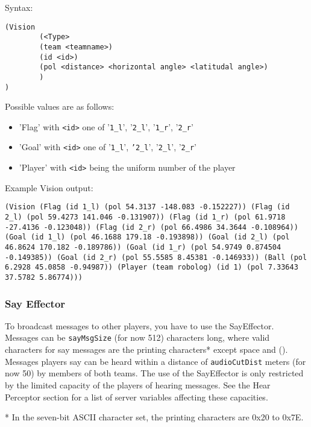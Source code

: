 Syntax: 
\begin{verbatim}
(Vision 
        (<Type> 
        (team <teamname>) 
        (id <id>) 
        (pol <distance> <horizontal angle> <latitudal angle>)
        )
)
\end{verbatim}

Possible values are as follows:

\begin{itemize}

\item 'Flag' with \texttt{<id>} one of '\texttt{1\_l}', '\texttt{2\_l}', '\texttt{1\_r}', '\texttt{2\_r}'
\item 'Goal' with \texttt{<id>} one of '\texttt{1\_l}', \texttt{'2\_l}', '\texttt{2\_l}', '\texttt{2\_r}'
\item 'Player' with \texttt{<id>} being the uniform number of the player

\end{itemize}

Example Vision output: 

\begin{verbatim}
(Vision (Flag (id 1_l) (pol 54.3137 -148.083 -0.152227)) (Flag (id
2_l) (pol 59.4273 141.046 -0.131907)) (Flag (id 1_r) (pol 61.9718
-27.4136 -0.123048)) (Flag (id 2_r) (pol 66.4986 34.3644 -0.108964))
(Goal (id 1_l) (pol 46.1688 179.18 -0.193898)) (Goal (id 2_l) (pol
46.8624 170.182 -0.189786)) (Goal (id 1_r) (pol 54.9749 0.874504
-0.149385)) (Goal (id 2_r) (pol 55.5585 8.45381 -0.146933)) (Ball (pol
6.2928 45.0858 -0.94987)) (Player (team robolog) (id 1) (pol 7.33643
37.5782 5.86774)))
\end{verbatim}

\subsubsection{Say Effector}

To broadcast messages to other players, you have to use the
SayEffector. Messages can be \texttt{sayMsgSize} (for now 512)
characters long, where valid characters for say messages are the
printing characters* except space and (). Messages players say can be
heard within a distance of \texttt{audioCutDist} meters (for now 50)
by members of both teams. The use of the SayEffector is only
restricted by the limited capacity of the players of hearing messages.
See the Hear Perceptor section for a list of server variables
affecting these capacities.

* In the seven-bit ASCII character set, the printing characters are
0x20 to 0x7E.

